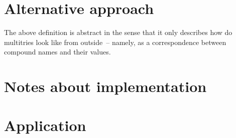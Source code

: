 \documentclass{article}
\theoremstyle{definition}
\begin{document}
\section{Alternative approach}

The above definition is abstract in the sense that it only describes how do
multitries look like from outside~-- namely, as a correspondence between
compound names and their values.

\section{Notes about implementation}

\section{Application}
\end{document}
